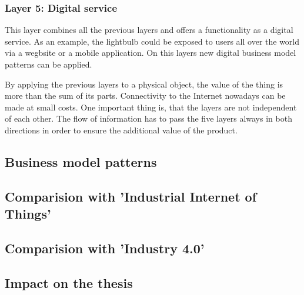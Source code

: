 \subsubsection{Layer 5: Digital service}
This layer combines all the previous layers and offers a functionality as a digital service. As an example, the lightbulb could be exposed to users all over the world via a wegbsite or a mobile application. On this layers new digital business model patterns can be applied.

By applying the previous layers to a physical object, the value of the thing is more than the sum of its parts. Connectivity to the Internet nowadays can be made at small costs. One important thing is, that the layers are not independent of each other. The flow of information has to pass the five layers always in both directions in order to ensure the additional value of the product.

\subsection{Business model patterns}

\subsection{Comparision with 'Industrial Internet of Things'}

\subsection{Comparision with 'Industry 4.0'}

\subsection{Impact on the thesis}
